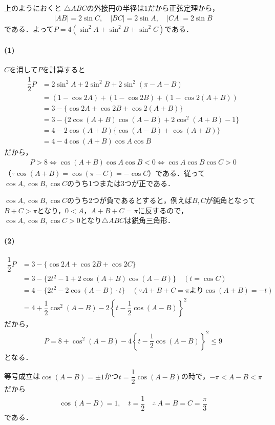 \documentclass[../../main.tex]{subfiles}
\begin{document}
上のようにおくと $\triangle ABC$の外接円の半径は$1$だから正弦定理から，
\begin{align}
  |AB|=2\sin C,\quad|BC|=2\sin A,\quad|CA|=2\sin B
\end{align}
である．よって$P=4(\sin^2A+\sin^2B+\sin^2C)$である．

\paragraph{(1)}

$C$を消して$P$を計算すると
\begin{align}
  \dfrac{1}{2}P
  &=2\sin^2A+2\sin^2B+2\sin^2(\pi-A-B)\\
  &=(1-\cos2A)+(1-\cos2B)+(1-\cos2(A+B)) \\
  &=3-\{\cos2A+\cos2B+\cos2(A+B)\}\\
  &=3-\{2\cos(A+B)\cos(A-B)+2\cos^2(A+B)-1\}\\
  &=4-2\cos(A+B)\{\cos(A-B)+\cos(A+B)\}\\
  &=4-4\cos(A+B)\cos A\cos B
\end{align}
だから，
\begin{align}
  P>8\iff\cos(A+B)\cos A\cos B<0\iff\cos A\cos B\cos C>0
\end{align}
（$\because\cos(A+B)=\cos(\pi-C)=-\cos C$）である．従って$\cos A,\cos B,\cos C$のうち1つまたは$3$つが正である．

$\cos A,\cos B,\cos C$のうち2つが負であるとすると，例えば$B,C$が鈍角となって$B+C>\pi$となり，$0<A$，$A+B+C=\pi$に反するので，$\cos A,\cos B,\cos C>0$となり$\triangle ABC$は鋭角三角形．

\paragraph{(2)}

\begin{align}
  \dfrac{1}{2}P&=3-\{\cos2A+\cos2B+\cos2C\}\\
  &=3-\{2t^2-1+2\cos(A+B)\cos(A-B)\}\quad(t=\cos C)\\
  &=4-\{2t^2-2\cos(A-B)\cdot t\}\quad(\because A+B+C=\pi\text{より}\cos(A+B)=-t)\\
  &=4+\dfrac{1}{2}\cos^2(A-B)-2\left\{t-\dfrac{1}{2}\cos(A-B)\right\}^2
\end{align}
だから，
\begin{align}
  P=8+\cos^2(A-B)-4\left\{t-\dfrac{1}{2}\cos(A-B)\right\}^2\le9
\end{align}
となる．

等号成立は$\cos(A-B)=\pm1$かつ$t=\dfrac{1}{2}\cos(A-B)$の時で，$-\pi<A-B<\pi$だから
\begin{align}
  \cos(A-B)=1,\quad t=\dfrac{1}{2}\quad\therefore\ A=B=C=\dfrac{\pi}{3}
\end{align}
である．

\newpage
\end{document}
